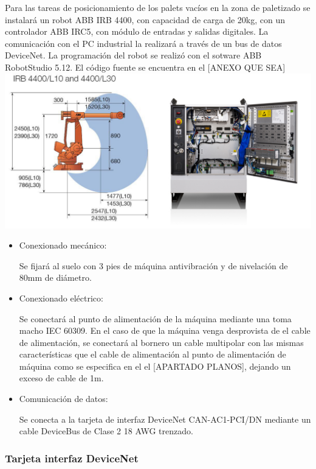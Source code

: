 	Para las tareas de posicionamiento de los palets vacíos en la zona de paletizado se instalará un robot ABB IRB 4400, con capacidad de carga de 20kg, con un controlador ABB IRC5, con módulo de entradas y salidas digitales. La comunicación con el PC industrial la realizará a través de un bus de datos DeviceNet. La programación del robot se realizó con el sotware ABB RobotStudio 5.12. El código fuente se encuentra en el [ANEXO QUE SEA]\\
		
	\includegraphics[scale=0.4]{Datasheets/9Foto.jpg}

		\begin{itemize}
				\item{Conexionado mecánico:}
				
				Se fijará al suelo con 3 pies de máquina antivibración y de nivelación de 80mm de diámetro.

				\item{Conexionado eléctrico:}

				Se conectará al punto de alimentación de la máquina mediante una  toma macho IEC 60309. En el caso de que la máquina venga desprovista de el cable de alimentación, se conectará al bornero un cable multipolar con las mismas características que el cable de alimentación al punto de alimentación de máquina como se especifica en el el [APARTADO PLANOS], dejando un exceso de cable de 1m. \	
							
				\item{Comunicación de datos:}

				Se conecta a la tarjeta de interfaz DeviceNet CAN-AC1-PCI/DN mediante un cable DeviceBus de Clase 2 18 AWG trenzado.
		\end{itemize}
\newpage

	\subsubsection{Tarjeta interfaz DeviceNet}

